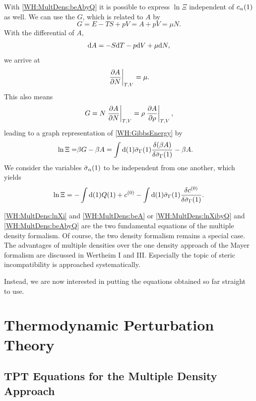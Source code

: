 \documentclass[8.5pt,twoside,twocolumn]{article}
\newcommand\di{\te{d}}
\newcommand\cze{\enmat{c^{(0)}}}
\newcommand\inon{\enmat{\int\di(1)}}
\newcommand\calp{\enmat{c_{\al}}}
\newcommand\sal{\enmat{\si_{\al}}}
\theoremstyle{standard}
\begin{document}
With \eqref{WH:MultDens:beAbyQ} it is possible to express $\ln\Xi$ independent of $\calp(1)$ as well.
We can use the  $G$, which is related to $A$ by
\begin{equation}
G=E-TS+pV=A+pV=\mu N.
\label{WH:GibbsEnergy}
\end{equation}
With the differential of $A$,
\begin{equation}
\di A=-S \di T - p \di V + \mu \di N, 
\end{equation} 
we arrive at
\begin{equation}
\left. \frac {\partial{A}} {\partial{N}} \right|_{T,V} = \mu.
\end{equation}
This also means
\begin{equation}
G=N \left. \frac {\partial{A}} {\partial{N}} \right|_{T,V} = \rho \left. \frac {\partial{A}} {\partial{\rho}} \right|_{T,V}, 
\end{equation}
leading to a graph representation of \eqref{WH:GibbsEnergy} by
\begin{equation}
\begin{aligned}
\ln\Xi =& \be G - \be A = \inon \siga(1) \delti{\rb{\be A}}{\siga(1)} - \be A.
\end{aligned}
\end{equation}
We consider the variables $\sal(1)$ to be independent from one another, which yields
\begin{equation}
\ln\Xi=-\inon Q(1) + \cze - \inon \siga(1)\delti{\cze}{\siga(1)}.
\label{WH:MultDens:lnXibyQ}
\end{equation} 

\eqref{WH:MultDens:lnXi} and \eqref{WH:MultDens:beA} or \eqref{WH:MultDens:lnXibyQ} and \eqref{WH:MultDens:beAbyQ}
are the two fundamental equations of the multiple density formalism. Of course, the
two density formalism remains a special case. The advantages of multiple densities over the
one density approach of the Mayer formalism are discussed in Wertheim I and III. Especially the topic of steric
incompatibility is approached systematically.

Instead, we are now interested in putting the equations obtained so far straight to use.


\section{Thermodynamic Perturbation Theory}
\label{TPT}
\newcommand\sia{\si_A}
\newcommand\sib{\si_B}
\newcommand\sig{\si_G}
\renewcommand\g{g_R(12)}
\newcommand{\tr}{\bar\rho}
\renewcommand{\e}{\eta}
\subsection{TPT Equations for the Multiple Density Approach}
\label{TPT:intro}
\end{document}
